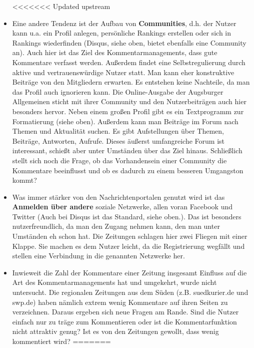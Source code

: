 \begin{itemize}
<<<<<<< Updated upstream
  \item Eine andere Tendenz ist der Aufbau von {\bfseries Communities}, d.h. der Nutzer kann u.a.
    ein Profil anlegen, persönliche Rankings erstellen oder sich in Rankings wiederfinden (Disqus,
    siehe oben,  bietet ebenfalls eine Community an). Auch hier ist das Ziel des
    Kommentarmanagements, dass gute Kommentare verfasst werden. Außerdem findet eine
    Selbstregulierung durch aktive und vertrauenswürdige Nutzer statt. Man kann eher konstruktive
    Beiträge von den Mitgliedern erwarten. Es entstehen keine Nachteile, da man das Profil auch
    ignorieren kann.  Die Online-Ausgabe der Augsburger Allgemeinen sticht mit ihrer Community und
    den Nutzerbeiträgen auch hier besonders hervor. Neben einem großen Profil gibt es ein
    Textprogramm zur Formatierung (siehe oben). Außerdem kann man Beiträge im Forum nach Themen und
    Aktualität suchen. Es gibt Aufstellungen über Themen, Beiträge, Antworten, Aufrufe. Dieses
    äußerst umfangreiche Forum ist interessant, schießt aber unter Umständen über das Ziel hinaus.
    Schließlich stellt sich noch die Frage, ob das Vorhandensein einer Community die Kommentare
    beeinflusst und ob es dadurch zu einem besseren Umgangston kommt?

  \item Was immer stärker von den Nachrichtenportalen genutzt wird ist das {\bfseries Anmelden über
    andere} soziale Netzwerke, allen voran Facebook und Twitter (Auch bei Disqus ist das Standard,
    siehe oben.). Das ist besonders nutzerfreundlich, da man den Zugang nehmen kann, den man unter
    Umständen eh schon hat. Die Zeitungen schlagen hier zwei Fliegen mit einer Klappe. Sie machen es
    dem Nutzer leicht, da die Registrierung wegfällt und stellen eine Verbindung in die genannten
    Netzwerke her.

  \item Inwieweit die Zahl der Kommentare einer Zeitung insgesamt Einfluss auf die Art des
    Kommentarmanagements hat und umgekehrt, wurde nicht untersucht. Die regionalen Zeitungen aus dem
    Süden (z.B. suedkurier.de und swp.de) haben nämlich extrem wenig Kommentare auf ihren Seiten zu
    verzeichnen.  Daraus ergeben sich neue Fragen am Rande. Sind die Nutzer einfach nur zu träge zum
    Kommentieren oder ist die Kommentarfunktion nicht attraktiv genug? Ist es von den Zeitungen
    gewollt, dass wenig kommentiert wird? 
=======





\end{itemize}
